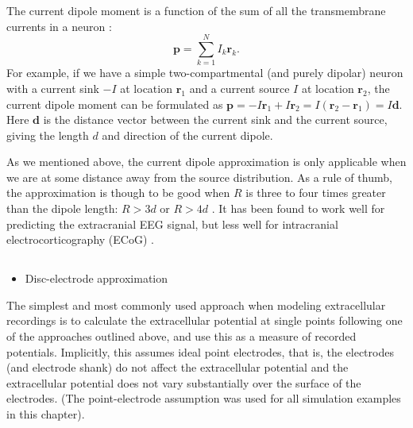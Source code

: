 The current dipole moment is a function of the sum of all the transmembrane currents in a neuron \citep{Pettersen2008, Pettersen2014, Nunez2006}: 
\begin{equation}\label{VC:eq:dipole}
\mathbf{p} = \sum_{k=1}^N I_k \mathbf{r}_k.
\end{equation}
For example, if we have a simple two-compartmental (and purely dipolar) neuron with a current sink $-I$ at location $\mathbf{r}_1$ and a current source $I$ at location $\mathbf{r}_2$, the current dipole moment can be formulated as $\mathbf{p} = -I\mathbf{r}_1 + I\mathbf{r}_2 = I(\mathbf{r}_2 - \mathbf{r}_1) = I\mathbf{d}$. Here $\mathbf{d}$ is the distance vector between the current sink and the current source, giving the length $d$ and direction of the current dipole. 

As we mentioned above, the current dipole approximation is only applicable when we are at some distance away from the source distribution. As a rule of thumb, the approximation is though to be good when $R$ is three to four times greater than the dipole length: $R > 3d$ or $R > 4d$ \citep{Nunez2006}. It has been found to work well for predicting the extracranial EEG signal, but less well for intracranial electrocorticography (ECoG) \citep{naess2020biophysical}.


\subsection{}
\label{sec:electrode}
\begin{itemize}
\item Disc-electrode approximation
\end{itemize}

The simplest and most commonly used approach when modeling extracellular recordings is to calculate the extracellular potential at single points following one of the approaches outlined above, and use this as a measure of recorded potentials. Implicitly, this assumes ideal point electrodes, that is, the electrodes (and electrode shank) do not affect the extracellular potential and the extracellular potential does not vary substantially over the surface of the electrodes. (The point-electrode assumption was used for all simulation examples in this chapter).

